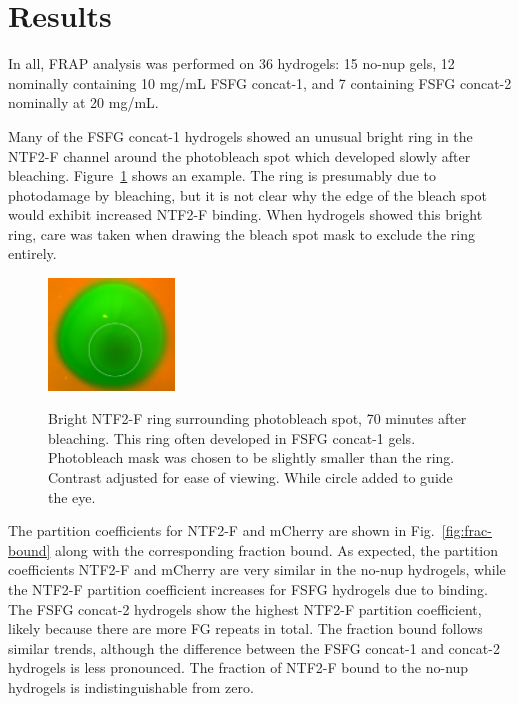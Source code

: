 \section{Results}

In all, FRAP analysis was performed on 36 hydrogels: 15 no-nup gels, 12 nominally containing 10 mg/mL FSFG concat-1, and 7 containing FSFG concat-2 nominally at 20 mg/mL. %

Many of the FSFG concat-1 hydrogels showed an unusual bright ring in the NTF2-F channel around the photobleach spot which developed slowly after bleaching.  Figure~\ref{fig:ring} shows an example.  The ring is presumably due to photodamage by bleaching, but it is not clear why the edge of the bleach spot would exhibit increased NTF2-F binding.  When hydrogels showed this bright ring, care was taken when drawing the bleach spot mask to exclude the ring entirely.

\begin{figure}
\caption[Bright NTF2-F ring surrounding photobleach spot.]{Bright NTF2-F ring surrounding photobleach spot, 70 minutes after bleaching.  This ring often developed in FSFG concat-1 gels.  Photobleach mask was chosen to be slightly smaller than the ring.  Contrast adjusted for ease of viewing. While circle added to guide the eye.\\}
\centering
\includegraphics[width=0.3\textwidth]{figs/ch04/ring}
\label{fig:ring}
\end{figure} 

The partition coefficients for NTF2-F and mCherry are shown in Fig.~\ref{fig:frac-bound} along with the corresponding fraction bound.  As expected, the partition coefficients NTF2-F and mCherry are very similar in the no-nup hydrogels, while the NTF2-F partition coefficient increases for FSFG hydrogels due to binding.  The FSFG concat-2 hydrogels show the highest NTF2-F partition coefficient, likely because there are more FG repeats in total.  The fraction bound follows similar trends, although the difference between the FSFG concat-1 and concat-2 hydrogels is less pronounced.  The fraction of NTF2-F bound to the no-nup hydrogels is indistinguishable from zero.

